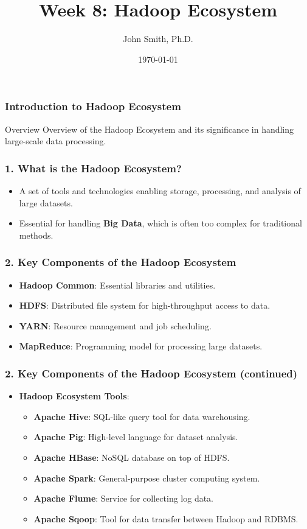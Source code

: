 \documentclass[aspectratio=169]{beamer}
\title[Week 8: Hadoop Ecosystem]{Week 8: Hadoop Ecosystem}
\author[J. Smith]{John Smith, Ph.D.}
\institute[University Name]{
  Department of Computer Science\\
  University Name\\
  \vspace{0.3cm}
  Email: email@university.edu\\
  Website: www.university.edu
}
\date{\today}
\begin{document}
\frame{\titlepage}

\begin{frame}[fragile]
    \frametitle{Introduction to Hadoop Ecosystem}
    \begin{block}{Overview}
        Overview of the Hadoop Ecosystem and its significance in handling large-scale data processing.
    \end{block}
\end{frame}

\begin{frame}[fragile]
    \frametitle{1. What is the Hadoop Ecosystem?}
    \begin{itemize}
        \item A set of tools and technologies enabling storage, processing, and analysis of large datasets.
        \item Essential for handling \textbf{Big Data}, which is often too complex for traditional methods.
    \end{itemize}
\end{frame}

\begin{frame}[fragile]
    \frametitle{2. Key Components of the Hadoop Ecosystem}
    \begin{itemize}
        \item \textbf{Hadoop Common}: Essential libraries and utilities.
        \item \textbf{HDFS}: Distributed file system for high-throughput access to data.
        \item \textbf{YARN}: Resource management and job scheduling.
        \item \textbf{MapReduce}: Programming model for processing large datasets.
    \end{itemize}
\end{frame}

\begin{frame}[fragile]
    \frametitle{2. Key Components of the Hadoop Ecosystem (continued)}
    \begin{itemize}
        \item \textbf{Hadoop Ecosystem Tools}:
        \begin{itemize}
            \item \textbf{Apache Hive}: SQL-like query tool for data warehousing.
            \item \textbf{Apache Pig}: High-level language for dataset analysis.
            \item \textbf{Apache HBase}: NoSQL database on top of HDFS.
            \item \textbf{Apache Spark}: General-purpose cluster computing system.
            \item \textbf{Apache Flume}: Service for collecting log data.
            \item \textbf{Apache Sqoop}: Tool for data transfer between Hadoop and RDBMS.
        \end{itemize}
    \end{itemize}
\end{frame}
\end{document}
